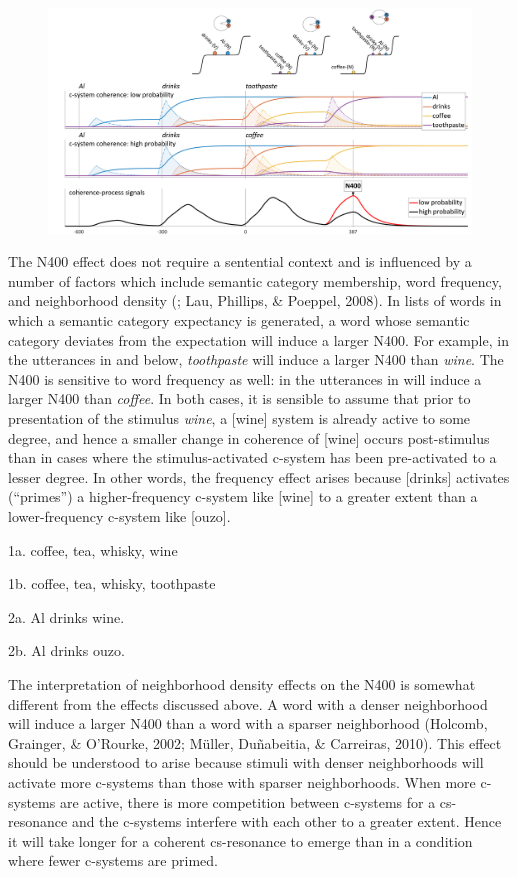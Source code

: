   
\begin{figure}
\includegraphics[width=\textwidth]{figures/Tilsen-img143.png}
\caption{\missingcaption}
\label{fig:}
\end{figure}
 

The N400 effect does not require a sentential context and is influenced by a number of factors which include semantic category membership, word frequency, and neighborhood density (\citealt{KutasFedermeier2011}; Lau, Phillips, \& Poeppel, 2008). In lists of words in which a semantic category expectancy is generated, a word whose semantic category deviates from the expectation will induce a larger N400. For example, in the utterances in  and  below, \textit{toothpaste} will induce a larger N400 than \textit{wine}. The N400 is sensitive to word frequency as well: in the utterances in  will induce a larger N400 than \textit{coffee}. In both cases, it is sensible to assume that prior to presentation of the stimulus \textit{wine}, a [wine] system is already active to some degree, and hence a smaller change in coherence of [wine] occurs post-stimulus than in cases where the stimulus-activated c-system has been pre-activated to a lesser degree. In other words, the frequency effect arises because [drinks] activates (“primes”) a higher-frequency c-system like [wine] to a greater extent than a lower-frequency c-system like [ouzo].

  1a. coffee, tea, whisky, wine

  1b. coffee, tea, whisky, toothpaste

  2a. Al drinks wine.

  2b. Al drinks ouzo.

  The interpretation of neighborhood density effects on the N400 is somewhat different from the effects discussed above. A word with a denser neighborhood will induce a larger N400 than a word with a sparser neighborhood (Holcomb, Grainger, \& O’Rourke, 2002; Müller, Duñabeitia, \& Carreiras, 2010). This effect should be understood to arise because stimuli with denser neighborhoods will activate more c-systems than those with sparser neighborhoods. When more c-systems are active, there is more competition between c-systems for a cs-resonance and the c-systems interfere with each other to a greater extent. Hence it will take longer for a coherent cs-resonance to emerge than in a condition where fewer c-systems are primed. 


